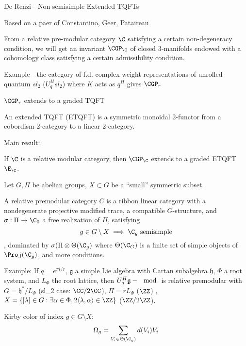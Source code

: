 De Renzi - Non-semisimple Extended TQFTs 

Based on a paer of Constantino, Geer, Pataireau

From a relative pre-modular category $\C$ satisfying a certain
non-degeneracy condition, we will get an invariant $\CGP_\C$ of closed
3-manifolds endowed with a cohomology class satisfying a certain
admissibility condition.

Example - the category of f.d. complex-weight representations of unrolled quantum $sl_2$  ($U_q^H sl_2$) where $K$ acts as $q^H$ gives $\CGP_r$

$\CGP_r$ extends to a graded TQFT

\begin{definition}
An extended TQFT (ETQFT) is a symmetric monoidal 2-functor from a 
cobordism 2-category to a linear 2-category.
\end{definition}

Main result:
\begin{theorem}[DR]
If $\C$ is a relative modular category, then $\CGP_\C$ extends to a graded ETQFT $\E_\C$.
\end{theorem}

Let $G, \Pi$ be abelian groups, $X \subset G$ be a ``small'' symmetric subset.

\begin{definition}
A relative premodular category $C$ is a ribbon linear category with a nondegenerate projective modified trace, a compatible $G$-structure, and
$\sigma: \Pi \to \C_0$ a free realization of $\Pi$, satisfying
$$g \in G \setminus X \implies \C_g \text{ semisimple} $$,
dominated by $\sigma(\Pi \otimes \Theta(\C_g)$ where $\Theta(\C_G)$ is a finite set of simple objects of $\Proj(\C_g)$,
and more conditions.
\end{definition}

Example: If $q = e^{\pi i / r}$, $\mathfrak g$ a simple Lie algebra with
Cartan subalgebra $\mathfrak h$, $\Phi$ a root system, and $L_\Phi$ the
root lattice, then $U_q^H \mathfrak g - \mod$ is relative premodular with $G =  \mathfrak h^* /  L_\Phi$ (sl_2 case: $\CC/ 2 \CC$), $\Pi = r L_\Phi$  ($\ZZ$) ,$X = \{ [\lambda] \in G : \exists \alpha \in \Phi, 2 \langle \lambda, \alpha \rangle \in \ZZ\}$ ($\ZZ / 2\ZZ$).

\begin{definition}
Kirby color of index $g \in G \setminus X$: 
$$ \Omega_g = \sum_{V_i \in \Theta(\C_g)} d(V_i) V_i $$
\end{definition}


